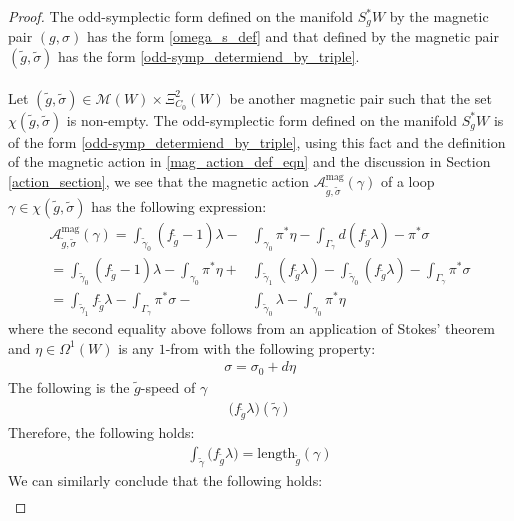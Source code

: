 \documentclass[11pt]{amsart}
\theoremstyle{plain}
\theoremstyle{definition}
\theoremstyle{remark}
\begin{document}
\begin{proof}
    The odd-symplectic form defined on the manifold $S^*_gW$ by the magnetic pair $(g,\sigma)$ has the form \eqref{omega_s_def} and that defined by the magnetic pair $(\tilde g,\tilde \sigma)$ has the form \eqref{odd-symp_determiend_by_triple}.\\
    \\
    Let $(\tilde g, \tilde\sigma) \in \mathcal{M}(W) \times \Xi^2_{C_0}(W)$ be another magnetic pair such that the set $\chi(\tilde g,\tilde\sigma)$ is non-empty. The odd-symplectic form defined on the manifold $S_g^*W$ is of the form \eqref{odd-symp_determiend_by_triple}, using this fact and the definition of the magnetic action in \eqref{mag_action_def_eqn} and the discussion in Section \ref{action_section}, we see that the magnetic action $\mathcal{A}^{\text{mag}}_{\tilde g,\tilde\sigma}(\gamma)$ of a loop $\gamma \in \chi(\tilde g,\tilde\sigma)$ has the following expression:
\begin{align}\label{mag_action_proof_0}
    \mathcal{A}^{\text{mag}}_{\tilde g,\tilde\sigma}(\gamma) = \int_{\tilde {\gamma}_0} (f_{\tilde g}-1)\lambda - &\int_{\gamma_0}\pi^*\eta  - \int_{\Gamma_{\gamma}} d(f_{\tilde g}\lambda)-\pi^*\sigma \\\nonumber = \int_{\tilde {\gamma}_0} (f_{\tilde g}-1)\lambda - \int_{\gamma_0}\pi^*\eta + &\int_{\tilde {\gamma}_1}(f_{\tilde g}\lambda) - \int_{\tilde {\gamma}_0}(f_{\tilde g}\lambda) - \int_{\Gamma_{\gamma}} \pi^*\sigma \\\nonumber =\int_{\tilde {\gamma}_1}f_{\tilde g}\lambda - \int_{\Gamma_{\gamma}}\pi^* \sigma - &\int_{\tilde {\gamma}_0} \lambda -\int_{\gamma_0} \pi^*\eta  
   \end{align}
   where the second equality above follows from an application of Stokes' theorem and $\eta \in \Omega^1(W)$ is any $1$-from with the following property:
\begin{align}\label{def_of_eat_mag_sys_ineq_1}
\sigma = \sigma_0 + d\eta
   \end{align}
The following is the $\tilde g$-speed of $\gamma$
\begin{align}
    \big(f_{\tilde g}\lambda\big)(\tilde  \gamma)
\end{align}
Therefore, the following holds:
\begin{align}
   \int_{\tilde  \gamma} \big(f_{\tilde g}\lambda\big) = \text{length}_{\tilde g}(\gamma)
\end{align}
We can similarly conclude that the following holds:
\begin{align}

\end{align}
\end{proof}
\end{document}
